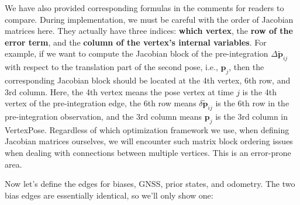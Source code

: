 We have also provided corresponding formulas in the comments for readers to compare. During implementation, we must be careful with the order of Jacobian matrices here. They actually have three indices: \textbf{which vertex}, the \textbf{row of the error term}, and the \textbf{column of the vertex's internal variables}. For example, if we want to compute the Jacobian block of the pre-integration $\Delta \tilde{\bm{p}}_{ij}$ with respect to the translation part of the second pose, i.e., $\bm{p}_j$, then the corresponding Jacobian block should be located at the 4th vertex, 6th row, and 3rd column. Here, the 4th vertex means the pose vertex at time $j$ is the 4th vertex of the pre-integration edge, the 6th row means $\delta \tilde{\bm{p}}_{ij}$ is the 6th row in the pre-integration observation, and the 3rd column means $\bm{p}_j$ is the 3rd column in VertexPose. Regardless of which optimization framework we use, when defining Jacobian matrices ourselves, we will encounter such matrix block ordering issues when dealing with connections between multiple vertices. This is an error-prone area.

Now let's define the edges for biases, GNSS, prior states, and odometry. The two bias edges are essentially identical, so we'll only show one:

